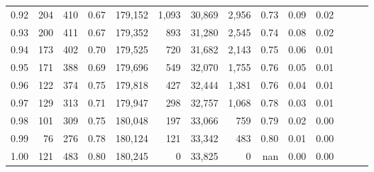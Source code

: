 \begin{tabular}{rrrrrrrrrrrrrr}
0.92 &    204 &  410 &  0.67 &  179,152 &    1,093 &  30,869 &   2,956 &  0.73 &  0.09 &      0.02 \\
0.93 &    200 &  411 &  0.67 &  179,352 &      893 &  31,280 &   2,545 &  0.74 &  0.08 &      0.02 \\
0.94 &    173 &  402 &  0.70 &  179,525 &      720 &  31,682 &   2,143 &  0.75 &  0.06 &      0.01 \\
0.95 &    171 &  388 &  0.69 &  179,696 &      549 &  32,070 &   1,755 &  0.76 &  0.05 &      0.01 \\
0.96 &    122 &  374 &  0.75 &  179,818 &      427 &  32,444 &   1,381 &  0.76 &  0.04 &      0.01 \\
0.97 &    129 &  313 &  0.71 &  179,947 &      298 &  32,757 &   1,068 &  0.78 &  0.03 &      0.01 \\
0.98 &    101 &  309 &  0.75 &  180,048 &      197 &  33,066 &     759 &  0.79 &  0.02 &      0.00 \\
0.99 &     76 &  276 &  0.78 &  180,124 &      121 &  33,342 &     483 &  0.80 &  0.01 &      0.00 \\
1.00 &    121 &  483 &  0.80 &  180,245 &        0 &  33,825 &       0 &   nan &  0.00 &      0.00 \\
\bottomrule
\end{tabular}

